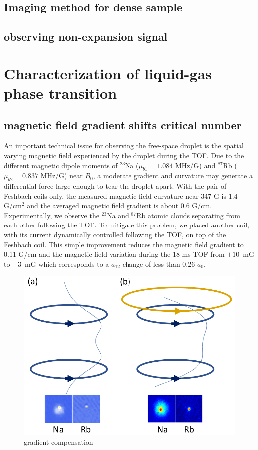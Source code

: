 \subsection{Imaging method for dense sample}
\subsection{observing non-expansion signal}

\section{Characterization of liquid-gas phase transition}
\subsection{magnetic field gradient shifts critical number}

An important technical issue for observing the free-space droplet is the spatial varying magnetic field experienced by the droplet during the TOF. 
Due to the different magnetic dipole moments of $^{23}$Na ($\mu_{b1} = 1.084$ MHz/G) and $^{87}$Rb ($\mu_{b2} = 0.837$ MHz/G) near $B_0$, a moderate gradient and curvature may generate a differential force large enough to tear the droplet apart. With the pair of Feshbach coils only, the measured magnetic field curvature near 347 G is 1.4 G/cm$^2$ and the averaged magnetic field gradient is about 0.6 G/cm. Experimentally, we observe the $^{23}$Na and $^{87}$Rb atomic clouds separating from each other following the TOF. To mitigate this problem, we placed another coil, with its current dynamically controlled following the TOF, on top of the Feshbach coil.
This simple improvement reduces the magnetic field gradient to 0.11 G/cm and the magnetic field variation during the 18 ms TOF from $\pm 10$~mG to 
$\pm 3$~mG which corresponds to a $a_{12}$ change of less than 0.26 $a_0$.


\begin{figure}[hb]
\begin{center}
\includegraphics[width = 0.8\linewidth]{figures/gradient_compensation.pdf}
\end{center}
\caption{gradient compensation}
\label{gradient_compensation}
\end{figure}

